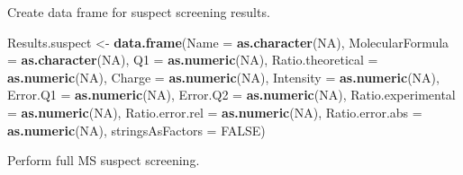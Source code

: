 \documentclass[]{article}
\newenvironment{Shaded}{\begin{snugshade}}{\end{snugshade}}
\newcommand{\KeywordTok}[1]{\textcolor[rgb]{0.13,0.29,0.53}{\textbf{#1}}}
\newcommand{\DataTypeTok}[1]{\textcolor[rgb]{0.13,0.29,0.53}{#1}}
\newcommand{\StringTok}[1]{\textcolor[rgb]{0.31,0.60,0.02}{#1}}
\newcommand{\OtherTok}[1]{\textcolor[rgb]{0.56,0.35,0.01}{#1}}
\newcommand{\NormalTok}[1]{#1}
\begin{document}
Create data frame for suspect screening results.

\begin{Shaded}
\begin{Highlighting}[]
\NormalTok{Results.suspect <-}\StringTok{ }\KeywordTok{data.frame}\NormalTok{(}\DataTypeTok{Name =} \KeywordTok{as.character}\NormalTok{(}\OtherTok{NA}\NormalTok{),}
                             \DataTypeTok{MolecularFormula =} \KeywordTok{as.character}\NormalTok{(}\OtherTok{NA}\NormalTok{),}
                             \DataTypeTok{Q1 =} \KeywordTok{as.numeric}\NormalTok{(}\OtherTok{NA}\NormalTok{),}
                             \DataTypeTok{Ratio.theoretical =} \KeywordTok{as.numeric}\NormalTok{(}\OtherTok{NA}\NormalTok{),}
                             \DataTypeTok{Charge =} \KeywordTok{as.numeric}\NormalTok{(}\OtherTok{NA}\NormalTok{),}
                             \DataTypeTok{Intensity =} \KeywordTok{as.numeric}\NormalTok{(}\OtherTok{NA}\NormalTok{),}
                             \DataTypeTok{Error.Q1 =} \KeywordTok{as.numeric}\NormalTok{(}\OtherTok{NA}\NormalTok{),}
                             \DataTypeTok{Error.Q2 =} \KeywordTok{as.numeric}\NormalTok{(}\OtherTok{NA}\NormalTok{),}
                             \DataTypeTok{Ratio.experimental =} \KeywordTok{as.numeric}\NormalTok{(}\OtherTok{NA}\NormalTok{),}
                             \DataTypeTok{Ratio.error.rel =} \KeywordTok{as.numeric}\NormalTok{(}\OtherTok{NA}\NormalTok{),}
                             \DataTypeTok{Ratio.error.abs =} \KeywordTok{as.numeric}\NormalTok{(}\OtherTok{NA}\NormalTok{), }\DataTypeTok{stringsAsFactors =} \OtherTok{FALSE}\NormalTok{)}
\end{Highlighting}
\end{Shaded}

Perform full MS suspect screening.
\end{document}

